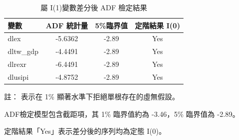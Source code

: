 \documentclass[a4paper,12pt]{article}
\begin{document}
\begin{table}[h]
    \centering
    \begin{threeparttable}
        \caption{屬 I(1)變數差分後 ADF 檢定結果}
        \label{tab:adf_diff_test}
        \begin{tabular}{lccc}
            \toprule
            變數 & ADF 統計量 & 5\%臨界值 & 定階結果 I(0) \\
            \midrule
            dlex     & -5.6362\tnote{***} & -2.89 & Yes \\
            dltw\_gdp & -4.4491\tnote{***} & -2.89 & Yes \\
            dlrexr   & -6.4491\tnote{***} & -2.89 & Yes \\
            dlusipi  & -4.8752\tnote{***} & -2.89 & Yes \\
            \bottomrule
        \end{tabular}

        \begin{tablenotes}
            \footnotesize
            \item 註：\tnote{***} 表示在 1\% 顯著水準下拒絕單根存在的虛無假設。
            \item ADF檢定模型包含截距項，其 1\% 臨界值約為 -3.46，5\% 臨界值為 -2.89。
            \item 定階結果「Yes」表示差分後的序列均為定態 I(0)。
        \end{tablenotes}
    \end{threeparttable}
\end{table}
\end{document}

